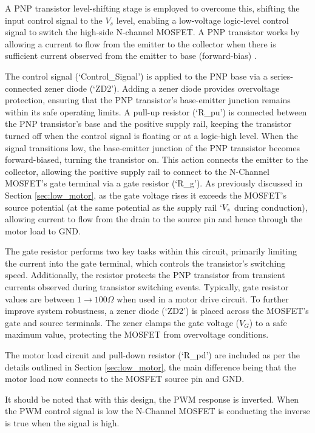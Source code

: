 A PNP transistor level-shifting stage is employed to overcome this, shifting the input control signal to the \(V_s\) level, enabling a low-voltage logic-level control signal to switch the high-side N-channel MOSFET. A PNP transistor works by allowing a current to flow from the emitter to the collector when there is sufficient current observed from the emitter to base (forward-bias) \cite[p.246]{Sedra_Smith_Microelectronic}.

The control signal (`Control\_Signal') is applied to the PNP base via a series-connected zener diode (`ZD2'). Adding a zener diode provides overvoltage protection, ensuring that the PNP transistor’s base-emitter junction remains within its safe operating limits. A pull-up resistor (`R\_pu') is connected between the PNP transistor’s base and the positive supply rail, keeping the transistor turned off when the control signal is floating or at a logic-high level. When the signal transitions low, the base-emitter junction of the PNP transistor becomes forward-biased, turning the transistor on. This action connects the emitter to the collector, allowing the positive supply rail to connect to the N-Channel MOSFET’s gate terminal via a gate resistor (`R\_g'). As previously discussed in Section \ref{sec:low_motor}, as the gate voltage rises it exceeds the MOSFET’s source potential (at the same potential as the supply rail \(`V_s\) during conduction), allowing current to flow from the drain to the source pin and hence through the motor load to GND.

The gate resistor performs two key tasks within this circuit, primarily limiting the current into the gate terminal, which controls the transistor's switching speed. Additionally, the resistor protects the PNP transistor from transient currents observed during transistor switching events. Typically, gate resistor values are between \(1\rightarrow100\Omega\) when used in a motor drive circuit. To further improve system robustness, a zener diode (`ZD2') is placed across the MOSFET’s gate and source terminals. The zener clamps the gate voltage (\(V_G\)) to a safe maximum value, protecting the MOSFET from overvoltage conditions.

The motor load circuit and pull-down resistor (`R\_pd') are included as per the details outlined in Section \ref{sec:low_motor}, the main difference being that the motor load now connects to the MOSFET source pin and GND.

It should be noted that with this design, the PWM response is inverted. When the PWM control signal is low the N-Channel MOSFET is conducting the inverse is true when the signal is high.

